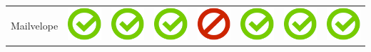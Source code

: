 \documentclass[10pt,foldmark,tumble]{leaflet}
\begin{document}
{\begin{tabular}{ L{2cm} | C{2cm} | C{2cm} | C{2cm} | C{2cm} | C{2cm} | C{2cm} | C{2cm} | }
Mailvelope   & \includegraphics[scale=0.1]{pics/haken.png} & \includegraphics[scale=0.1]{pics/haken.png} & \includegraphics[scale=0.1]{pics/haken.png} & \includegraphics[scale=0.1]{pics/nohaken.png} & \includegraphics[scale=0.1]{pics/haken.png} & \includegraphics[scale=0.1]{pics/haken.png} & \includegraphics[scale=0.1]{pics/haken.png} \tabularnewline

\end{tabular}}
\end{document}
